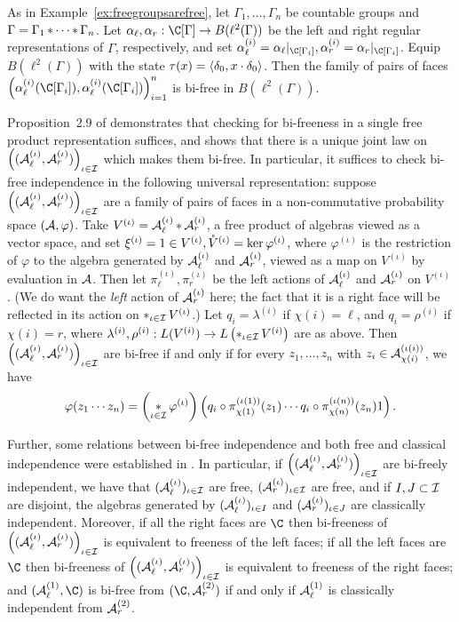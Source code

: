 \begin{example}
	As in Example~\ref{ex:freegroupsarefree}, let $\Gamma_1, \ldots, \Gamma_n$ be countable groups and $\Gamma = \Gamma_1\mathop{\ast}\cdots\mathop{\ast}\Gamma_n$.
	Let $\alpha_\ell, \alpha_r : \C[\Gamma] \to B(\ell^2(\Gamma))$ be the left and right regular representations of $\Gamma$, respectively, and set $\alpha_\ell^{(i)} = \alpha_\ell|_{\C[\Gamma_i]}, \alpha_r^{(i)} = \alpha_r|_{\C[\Gamma_i]}$.
	Equip $B(\ell^2(\Gamma))$ with the state $\tau(x) = \left\langle\delta_0, x\cdot\delta_0\right\rangle$.
	Then the family of pairs of faces $\paren{\alpha_\ell^{(i)}(\C[\Gamma_i]), \alpha_\ell^{(i)}(\C[\Gamma_i])}_{i=1}^n$ is bi-free in $B(\ell^2(\Gamma))$.
\end{example}

Proposition~2.9 of \cite{voiculescu2014free} demonstrates that checking for bi-freeness in a single free product representation suffices, and shows that there is a unique joint law on $\left((\mathcal{A}_\ell^{(\iota)}, \mathcal{A}_r^{(\iota)})\right)_{\iota\in\mathcal{I}}$ which makes them bi-free.
In particular, it suffices to check bi-free independence in the following universal representation: suppose $\left((\mathcal{A}_\ell^{(\iota)}, \mathcal{A}_r^{(\iota)})\right)_{\iota\in\mathcal{I}}$ are a family of pairs of faces in a non-commutative probability space $(\mathcal{A}, \varphi)$.
Take $V^{(\iota)} = \mathcal{A}_\ell^{(\iota)}\mathop{\ast}\mathcal{A}_r^{(\iota)}$, a free product of algebras viewed as a vector space, and set $\xi^{(\iota)} = 1 \in V^{(\iota)}, \mathring{V}^{(\iota)} = \ker \varphi^{(\iota)}$, where $\varphi^{(\iota)}$ is the restriction of $\varphi$ to the algebra generated by $\mathcal{A}_\ell^{(\iota)}$ and $\mathcal{A}_r^{(\iota)}$, viewed as a map on $V^{(\iota)}$ by evaluation in $\mathcal{A}$.
Then let $\pi_\ell^{(\iota)}, \pi_r^{(\iota)}$ be the left actions of $\mathcal{A}_\ell^{(\iota)}$ and $\mathcal{A}_r^{(\iota)}$ on $V^{(\iota)}$.
(We do want the \emph{left} action of $\mathcal{A}_r^{(\iota)}$ here; the fact that it is a right face will be reflected in its action on $\mathop{\ast}_{\iota\in\mathcal{I}}V^{(\iota)}$.)
Let $q_i = \lambda^{(i)}$ if $\chi(i) = \ell$, and $q_i = \rho^{(i)}$ if $\chi(i) = r$, where $\lambda^{(i)}, \rho^{(i)} : L(V^{(i)}) \to L\left(\mathop{\ast}_{\iota\in\mathcal{I}}V^{(i)}\right)$ are as above.
Then $\left((\mathcal{A}_\ell^{(\iota)}, \mathcal{A}_r^{(\iota)})\right)_{\iota\in\mathcal{I}}$ are bi-free if and only if for every $z_1, \ldots, z_n$ with $z_i \in \mathcal{A}_{\chi(i)}^{(\iota(i))}$, we have
$$\varphi(z_1\cdots z_n) = \left(\mathop{\ast}_{\iota\in\mathcal{I}}\varphi^{(\iota)}\right) \left( q_i\circ\pi_{\chi(1)}^{(\iota(1))}(z_1)\cdots q_i\circ\pi_{\chi(n)}^{(\iota(n))}(z_n) 1 \right).$$

Further, some relations between bi-free independence and both free and classical independence were established in \cite{voiculescu2014free}.
In particular, if $\left((\mathcal{A}_\ell^{(\iota)}, \mathcal{A}_r^{(\iota)})\right)_{\iota\in\mathcal{I}}$ are bi-freely independent, we have that $(\mathcal{A}_\ell^{(\iota)})_{\iota\in\mathcal{I}}$ are free, $(\mathcal{A}_r^{(\iota)})_{\iota\in\mathcal{I}}$ are free, and if $I, J \subset \mathcal{I}$ are disjoint, the algebras generated by $(\mathcal{A}_\ell^{(\iota)})_{\iota\in I}$ and $(\mathcal{A}_r^{(\iota)})_{\iota\in J}$ are classically independent.
Moreover, if all the right faces are $\C$ then bi-freeness of $\left((\mathcal{A}_\ell^{(\iota)}, \mathcal{A}_r^{(\iota)})\right)_{\iota\in\mathcal{I}}$ is equivalent to freeness of the left faces; if all the left faces are $\C$ then bi-freeness of $\left((\mathcal{A}_\ell^{(\iota)}, \mathcal{A}_r^{(\iota)})\right)_{\iota\in\mathcal{I}}$ is equivalent to freeness of the right faces; and $(\A_\ell^{(1)}, \C)$ is bi-free from $(\C, \A_r^{(2)})$ if and only if $\mathcal{A}_\ell^{(1)}$ is classically independent from $\mathcal{A}_r^{(2)}$.

